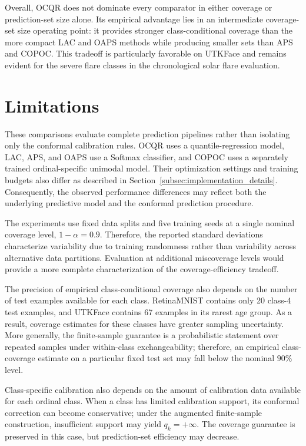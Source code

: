 \documentclass[conference]{IEEEtran}
\begin{document}
Overall, OCQR does not dominate every comparator in either coverage or prediction-set size alone. Its empirical advantage lies in an intermediate coverage-set size operating point: it provides stronger class-conditional coverage than the more compact LAC and OAPS methods while producing smaller sets than APS and COPOC. This tradeoff is particularly favorable on UTKFace and remains evident for the severe flare classes in the chronological solar flare evaluation.

\section{Limitations}
These comparisons evaluate complete prediction pipelines rather than isolating only the conformal calibration rules. OCQR uses a quantile-regression model, LAC, APS, and OAPS use a Softmax classifier, and COPOC uses a separately trained ordinal-specific unimodal model. Their optimization settings and training budgets also differ as described in Section~\ref{subsec:implementation_details}. Consequently, the observed performance differences may reflect both the underlying predictive model and the conformal prediction procedure.

The experiments use fixed data splits and five training seeds at a single nominal coverage level, \(1-\alpha=0.9\). Therefore, the reported standard deviations characterize variability due to training randomness rather than variability across alternative data partitions. Evaluation at additional miscoverage levels would provide a more complete characterization of the coverage-efficiency tradeoff.

The precision of empirical class-conditional coverage also depends on the number of test examples available for each class. RetinaMNIST contains only 20 class-4 test examples, and UTKFace contains 67 examples in its rarest age group. As a result, coverage estimates for these classes have greater sampling uncertainty. More generally, the finite-sample guarantee is a probabilistic statement over repeated samples under within-class exchangeability; therefore, an empirical class-coverage estimate on a particular fixed test set may fall below the nominal \(90\%\) level.

Class-specific calibration also depends on the amount of calibration data available for each ordinal class. When a class has limited calibration support, its conformal correction can become conservative; under the augmented finite-sample construction, insufficient support may yield \(q_k=+\infty\). The coverage guarantee is preserved in this case, but prediction-set efficiency may decrease.
\end{document}
